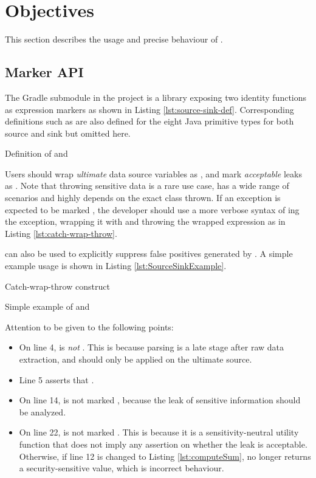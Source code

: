\section{Objectives}
This section describes the usage and precise behaviour of \pname{}.

\subsection{Marker API}
The  Gradle submodule in the project
is a library exposing two identity functions as expression markers
as shown in Listing \ref{lst:source-sink-def}.
Corresponding definitions such as 
are also defined for the eight Java primitive types
for both source and sink but omitted here.

{Definition of  and }

Users should wrap \emph{ultimate} data source variables as ,
and mark \emph{acceptable} leaks as .
Note that throwing sensitive data is a rare use case,
has a wide range of scenarios
and highly depends on the exact class thrown.
If an exception is expected to be marked ,
the developer should use a more verbose syntax of ing the exception,
wrapping it with  and throwing the wrapped expression as in Listing \ref{lst:catch-wrap-throw}.

 can also be used to explicitly suppress false positives generated by \pname{}.
A simple example usage is shown in Listing \ref{lst:SourceSinkExample}.

{Catch-wrap-throw construct}


{Simple example of  and }

Attention to be given to the following points:
\begin{itemize}
	\item On line 4,  is \emph{not} .
		This is because parsing is a late stage after raw data extraction,
		and  should only be applied on the ultimate source.
	\item Line 5 asserts that .
	\item On line 14,  is not marked ,
		because the leak of sensitive information should be analyzed.
	\item On line 22,  is not marked .
		This is because it is a sensitivity-neutral utility function
		that does not imply any assertion on whether the leak is acceptable.
		Otherwise, if line 12 is changed to Listing \ref{lst:computeSum},
		 no longer returns a security-sensitive value,
		which is incorrect behaviour.
\end{itemize}

